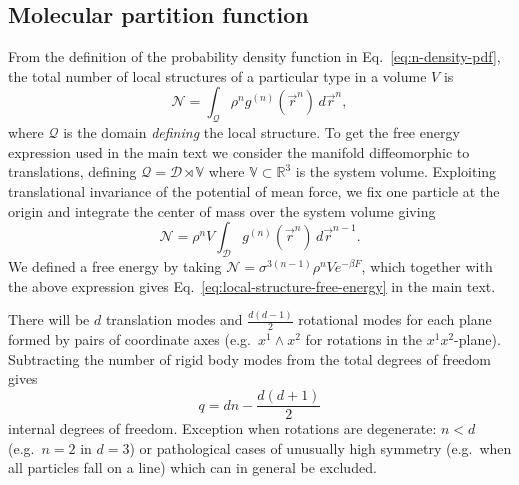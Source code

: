 \documentclass[11pt,twoside]{report}
\begin{document}
\subsection{Molecular partition function}

From the definition of the probability density function in Eq.\ \eqref{eq:n-density-pdf}, the total number of local structures of a particular type in a volume $V$ is
\begin{equation}\label{eq:structure-population}
  \mathcal{N} =
  \int_{\mathcal{Q}} \rho^n g^{(n)}(\vec{r}^n) \, d\vec{r}^n,
\end{equation}
where $\mathcal{Q}$ is the domain \emph{defining} the local structure.
To get the free energy expression used in the main text we consider the manifold diffeomorphic to translations, defining $\mathcal{Q} = \mathcal{D} \rtimes \mathbb{V}$ where $\mathbb{V}\subset \mathbb{R}^3$ is the system volume.
Exploiting translational invariance of the potential of mean force, we fix one particle at the origin and integrate the center of mass over the system volume giving
\begin{equation}
  \mathcal{N} =
  \rho^n V \int_{\mathcal{D}} g^{(n)}(\vec{r}^n) \, d\vec{r}^{n-1}.
\end{equation}
We defined a free energy by taking $\mathcal{N} = \sigma^{3(n-1)} \rho^n V e^{-\beta F}$, which together with the above expression gives Eq.\ \eqref{eq:local-structure-free-energy} in the main text.

There will be $d$ translation modes and $\frac{d(d-1)}{2}$ rotational modes for each plane formed by pairs of coordinate axes (e.g.\ $x^1 \wedge x^2$ for rotations in the $x^1x^2$-plane).
Subtracting the number of rigid body modes from the total degrees of freedom gives \[ q = dn - \frac{d(d+1)}{2} \] internal degrees of freedom.
Exception when rotations are degenerate: $n < d$ (e.g.\ $n=2$ in $d=3$) or pathological cases of unusually high symmetry (e.g.\ when all particles fall on a line) which can in general be excluded.
\end{document}
